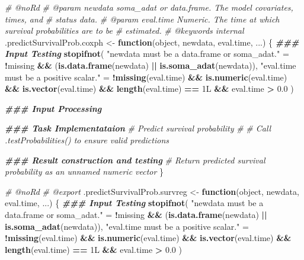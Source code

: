 \documentclass[
]{book}
\newenvironment{Shaded}{\begin{snugshade}}{\end{snugshade}}
\newcommand{\CommentTok}[1]{\textcolor[rgb]{0.56,0.35,0.01}{\textit{#1}}}
\newcommand{\ControlFlowTok}[1]{\textcolor[rgb]{0.13,0.29,0.53}{\textbf{#1}}}
\newcommand{\DocumentationTok}[1]{\textcolor[rgb]{0.56,0.35,0.01}{\textbf{\textit{#1}}}}
\newcommand{\FloatTok}[1]{\textcolor[rgb]{0.00,0.00,0.81}{#1}}
\newcommand{\FunctionTok}[1]{\textcolor[rgb]{0.13,0.29,0.53}{\textbf{#1}}}
\newcommand{\NormalTok}[1]{#1}
\newcommand{\OtherTok}[1]{\textcolor[rgb]{0.56,0.35,0.01}{#1}}
\newcommand{\SpecialCharTok}[1]{\textcolor[rgb]{0.81,0.36,0.00}{\textbf{#1}}}
\newcommand{\StringTok}[1]{\textcolor[rgb]{0.31,0.60,0.02}{#1}}
\begin{document}
\begin{Shaded}
\begin{Highlighting}[]
\CommentTok{\#\textquotesingle{} @noRd}
\CommentTok{\#\textquotesingle{} @param newdata soma\_adat or data.frame. The model covariates, times, and}
\CommentTok{\#\textquotesingle{}   status data.}
\CommentTok{\#\textquotesingle{} @param eval.time Numeric. The time at which survival probabilities are to be}
\CommentTok{\#\textquotesingle{}   estimated.}
\CommentTok{\#\textquotesingle{} @keywords internal}
\NormalTok{.predictSurvivalProb.coxph }\OtherTok{\textless{}{-}} \ControlFlowTok{function}\NormalTok{(object, newdata, eval.time, ...) \{}
  \DocumentationTok{\#\#\# Input Testing}
  \FunctionTok{stopifnot}\NormalTok{(}
    \StringTok{"\textasciigrave{}newdata\textasciigrave{} must be a data.frame or soma\_adat."} \OtherTok{=} 
      \SpecialCharTok{!}\NormalTok{missing }\SpecialCharTok{\&\&}\NormalTok{ (}\FunctionTok{is.data.frame}\NormalTok{(newdata) }\SpecialCharTok{||} \FunctionTok{is.soma\_adat}\NormalTok{(newdata)),}
    \StringTok{"\textasciigrave{}eval.time\textasciigrave{} must be a positive scalar."} \OtherTok{=} 
      \SpecialCharTok{!}\FunctionTok{missing}\NormalTok{(eval.time) }\SpecialCharTok{\&\&} \FunctionTok{is.numeric}\NormalTok{(eval.time) }\SpecialCharTok{\&\&} 
        \FunctionTok{is.vector}\NormalTok{(eval.time) }\SpecialCharTok{\&\&} \FunctionTok{length}\NormalTok{(eval.time) }\SpecialCharTok{==}\NormalTok{ 1L }\SpecialCharTok{\&\&}\NormalTok{ eval.time }\SpecialCharTok{\textgreater{}} \FloatTok{0.0}
\NormalTok{  )}
  
  \DocumentationTok{\#\#\# Input Processing}
  
  \DocumentationTok{\#\#\# Task Implementataion}
  \CommentTok{\# Predict survival probability}
  \CommentTok{\#}
  \CommentTok{\# Call .testProbabilities() to ensure valid predictions}
  
  \DocumentationTok{\#\#\# Result construction and testing}
  \CommentTok{\# Return predicted survival probability as an unnamed numeric vector}
\NormalTok{\}}

\CommentTok{\#\textquotesingle{} @noRd}
\CommentTok{\#\textquotesingle{} @export}
\NormalTok{.predictSurvivalProb.survreg }\OtherTok{\textless{}{-}} \ControlFlowTok{function}\NormalTok{(object, newdata, eval.time, ...) \{}
  \DocumentationTok{\#\#\# Input Testing}
  \FunctionTok{stopifnot}\NormalTok{(}
    \StringTok{"\textasciigrave{}newdata\textasciigrave{} must be a data.frame or soma\_adat."} \OtherTok{=} 
      \SpecialCharTok{!}\NormalTok{missing }\SpecialCharTok{\&\&}\NormalTok{ (}\FunctionTok{is.data.frame}\NormalTok{(newdata) }\SpecialCharTok{||} \FunctionTok{is.soma\_adat}\NormalTok{(newdata)),}
    \StringTok{"\textasciigrave{}eval.time\textasciigrave{} must be a positive scalar."} \OtherTok{=} 
      \SpecialCharTok{!}\FunctionTok{missing}\NormalTok{(eval.time) }\SpecialCharTok{\&\&} \FunctionTok{is.numeric}\NormalTok{(eval.time) }\SpecialCharTok{\&\&} 
        \FunctionTok{is.vector}\NormalTok{(eval.time) }\SpecialCharTok{\&\&} \FunctionTok{length}\NormalTok{(eval.time) }\SpecialCharTok{==}\NormalTok{ 1L }\SpecialCharTok{\&\&}\NormalTok{ eval.time }\SpecialCharTok{\textgreater{}} \FloatTok{0.0}
\NormalTok{  )}
  

\end{Highlighting}
\end{Shaded}
\end{document}
